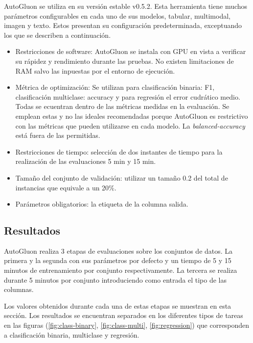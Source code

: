 AutoGluon se utiliza en su versión estable v0.5.2. Esta herramienta tiene muchos parámetros configurables en cada uno de sus modelos, tabular, multimodal, imagen y texto. 
Estos presentan su configuración predeterminada, exceptuando los que se describen a continuación.
\begin{itemize}
    \item Restricciones de software: AutoGluon se instala con GPU en vista a verificar su rápidez y rendimiento durante las pruebas. No existen limitaciones de RAM salvo
    las inpuestas por el entorno de ejecución.
    \item Métrica de optimización: Se utilizan para clasificación binaria: F1, clasificación multiclase: accuracy y para regresión el error cudrático medio. Todas se 
    ecuentran dentro de las métricas medidas en la evaluación. Se emplean estas y no las ideales recomendadas porque AutoGluon es restrictivo con las métricas que 
    pueden utilizarse en cada modelo. La \textit{balanced-accuracy} está fuera de las permitidas.
    \item Restricciones de tiempo: selección de dos instantes de tiempo para la realización de las evaluaciones 5 min y 15 min. 
    \item Tamaño del conjunto de validación: utilizar un tamaño 0.2 del total de instancias que equivale a un 20\%. 
    \item Parámetros obligatorios: la etiqueta de la columna salida.  
\end{itemize}


\subsection{Resultados}\label{subsection:results}
AutoGluon realiza 3 etapas de evaluaciones sobre los conjuntos de datos. La primera y la segunda con sus parámetros por defecto y un tiempo de 5 y 15 minutos de entrenamiento
por conjunto respectivamente. La tercera se realiza durante 5 minutos por conjunto introduciendo como entrada el tipo de las columnas. 

Los valores obtenidos durante cada una de estas etapas se muestran en esta sección. Los resultados se encuentran separados en los diferentes tipos de tareas
en las figuras (\ref{fig:class-binary}, \ref{fig:class-multi}, \ref{fig:regression}) que corresponden a clasificación binaria, multiclase y regresión.  

